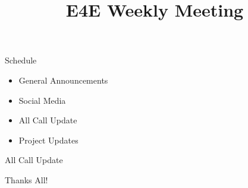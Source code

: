 \documentclass[aspectratio=169]{beamer}
\title{E4E Weekly Meeting}
\institute{UC San Diego}
\begin{document}
\maketitle
\begin{frame}{Schedule}
    \begin{itemize}
        \item General Announcements
        \item Social Media
        \item All Call Update
              \begin{enumerate}
                  
              \end{enumerate}
        \item Project Updates
              \begin{enumerate}
                  
              \end{enumerate}
    \end{itemize}
\end{frame}

\begin{frame}{All Call Update}
    \begin{enumerate}
        
    \end{enumerate}
\end{frame}

\begin{frame}
    \centering
    Thanks All!
\end{frame}
\end{document}

